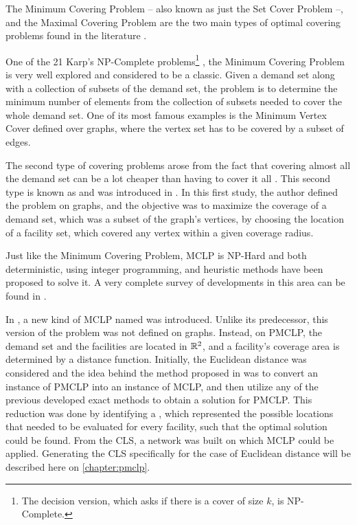 The Minimum Covering Problem -- also known as just the Set Cover Problem --, and the Maximal Covering Problem are the two main types of optimal covering problems found in the literature \cite{karatas}. 

One of the 21 Karp's NP-Complete problems\footnote{The decision version, which asks if there is a cover of size $k$, is NP-Complete.} \cite{karp}, the Minimum Covering Problem is very well explored and considered to be a classic. 
Given a demand set along with a collection of subsets of the demand set, the problem is to determine the minimum number of elements from the collection of subsets needed to cover the whole demand set. One of its most famous examples is the Minimum Vertex Cover defined over graphs, where the vertex set has to be covered by a subset of edges.

The second type of covering problems arose from the fact that covering almost all the demand set can be a lot cheaper than having to cover it all \cite{garcia}. This second type is known as  and was introduced in .
In this first study, the author defined the problem on graphs, and the objective was to maximize the coverage of a demand set, which was a subset of the graph's vertices, by choosing the location of a facility set, which covered any vertex within a given coverage radius.

Just like the Minimum Covering Problem, MCLP is NP-Hard \cite{hatta:2013} and both deterministic, using integer programming, and heuristic methods have been proposed to solve it. A very complete survey of developments in this area can be found in .

In , a new kind of MCLP named  was introduced. Unlike its predecessor, this version of the problem was not defined on graphs. Instead, on PMCLP, the demand set and the facilities are located in $\mathbb{R}^2$, and a facility's coverage area is determined by a distance function.
Initially, the Euclidean distance was considered and the idea behind the method proposed in  was to convert an instance of PMCLP into an instance of MCLP, and then utilize any of the previous developed exact methods to obtain a solution for PMCLP. This reduction was done by identifying a , which represented the possible locations that needed to be evaluated for every facility, such that the optimal solution could be found. From the CLS, a network was built on which MCLP could be applied. Generating the CLS specifically for the case of Euclidean distance will be described here on \autoref{chapter:pmclp}.

